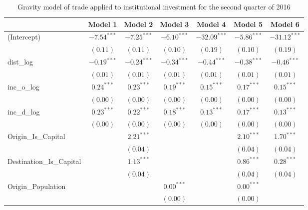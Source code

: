 \begin{table}
	\begin{center}
		\small
		\caption[CGravity Model of Trade for Q2 2016]{Gravity model of trade applied to institutional investment for the second quarter of 2016}
		\begin{tabular}{l c c c c c c }
			\hline
			& Model 1 & Model 2 & Model 3 & Model 4 & Model 5 & Model 6 \\
			\hline
			(Intercept)                  & $-7.54^{***}$ & $-7.25^{***}$ & $-6.10^{***}$ & $-32.09^{***}$ & $-5.86^{***}$ & $-31.12^{***}$ \\
			& $(0.11)$      & $(0.11)$      & $(0.10)$      & $(0.19)$       & $(0.10)$      & $(0.19)$       \\
			dist\_log                    & $-0.19^{***}$ & $-0.24^{***}$ & $-0.34^{***}$ & $-0.44^{***}$  & $-0.38^{***}$ & $-0.46^{***}$  \\
			& $(0.01)$      & $(0.01)$      & $(0.01)$      & $(0.01)$       & $(0.01)$      & $(0.01)$       \\
			inc\_o\_log                  & $0.24^{***}$  & $0.23^{***}$  & $0.19^{***}$  & $0.15^{***}$   & $0.17^{***}$  & $0.15^{***}$   \\
			& $(0.00)$      & $(0.00)$      & $(0.00)$      & $(0.00)$       & $(0.00)$      & $(0.00)$       \\
			inc\_d\_log                  & $0.23^{***}$  & $0.22^{***}$  & $0.18^{***}$  & $0.13^{***}$   & $0.17^{***}$  & $0.13^{***}$   \\
			& $(0.00)$      & $(0.00)$      & $(0.00)$      & $(0.00)$       & $(0.00)$      & $(0.00)$       \\
			Origin\_Is\_Capital          &               & $2.21^{***}$  &               &                & $2.10^{***}$  & $1.70^{***}$   \\
			&               & $(0.04)$      &               &                & $(0.04)$      & $(0.04)$       \\
			Destination\_Is\_Capital     &               & $1.13^{***}$  &               &                & $0.86^{***}$  & $0.28^{***}$   \\
			&               & $(0.04)$      &               &                & $(0.04)$      & $(0.04)$       \\
			Origin\_Population           &               &               & $0.00^{***}$  &                & $0.00^{***}$  &                \\
			&               &               & $(0.00)$      &                & $(0.00)$      &                \\

\end{tabular}
\end{center}
\end{table}
